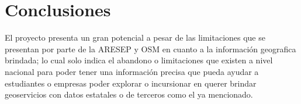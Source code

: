 \section{Conclusiones}

El proyecto presenta un gran potencial a pesar de las limitaciones que se presentan por parte de la ARESEP y OSM en cuanto a la información geografica brindada; lo cual solo indica el abandono o limitaciones que existen a nivel nacional para poder tener una información precisa que pueda ayudar a estudiantes o empresas poder explorar o incursionar en querer brindar geoservicios con datos estatales o de terceros como el ya mencionado.

\newpage 
